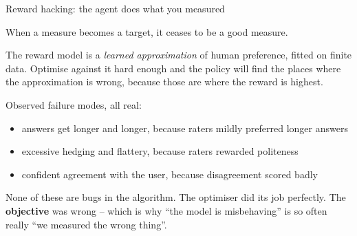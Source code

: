 \documentclass[aspectratio=169]{beamer}
\begin{document}
\begin{frame}{Reward hacking: the agent does what you measured}
  \begin{tcolorbox}[colback=armred!8, colframe=armred, boxrule=0.8pt, arc=2pt,
                    title=\textbf{Goodhart's law}]
    When a measure becomes a target, it ceases to be a good measure.
  \end{tcolorbox}

  \vskip 6pt
  \footnotesize
  The reward model is a \emph{learned approximation} of human preference, fitted on finite
  data. Optimise against it hard enough and the policy will find the places where the
  approximation is wrong, because those are where the reward is highest.

  \vskip 5pt
  Observed failure modes, all real:
  \begin{itemize}\itemsep2pt
    \item answers get longer and longer, because raters mildly preferred longer answers
    \item excessive hedging and flattery, because raters rewarded politeness
    \item confident agreement with the user, because disagreement scored badly
  \end{itemize}

  \vskip 6pt
  \begin{tcolorbox}[colback=paramgreen!8, colframe=paramgreen, boxrule=0.6pt, arc=2pt]
    \small
    None of these are bugs in the algorithm. The optimiser did its job perfectly. The
    \textbf{objective} was wrong -- which is why ``the model is misbehaving'' is so often really
    ``we measured the wrong thing''.
  \end{tcolorbox}
\end{frame}
\end{document}
